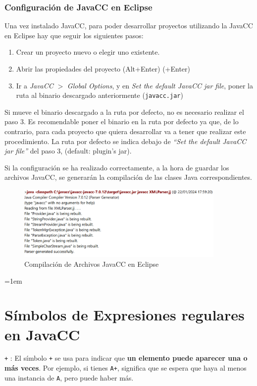 \subsubsection{Configuración de JavaCC en Eclipse}

Una vez instalado JavaCC, para poder desarrollar proyectos utilizando la JavaCC en Eclipse hay que seguir los siguientes pasos:
\begin{enumerate}
    \item Crear un proyecto nuevo o elegir uno existente.
    \item Abrir las propiedades del proyecto (Alt+Enter) (\cmdkey+Enter)
    \item  Ir a \textit{JavaCC} $>$ \textit{Global Options}, y en \textit{Set the default JavaCC jar file}, poner la ruta al binario descargado anteriormente (\lstinline|javacc.jar|)
\end{enumerate}

Si mueve el binario descargado a la ruta por defecto, no es necesario realizar el paso 3. Es recomendable poner el binario en la ruta por defecto ya que, de lo contrario, para cada proyecto que quiera desarrollar va a tener que realizar este procedimiento. La ruta por defecto se indica debajo de \textit{“Set the default JavaCC jar file”} del paso 3, (default: plugin’s jar).

Si la configuración se ha realizado correctamente, a la hora de guardar los archivos JavaCC, se generarán la compilación de las clases Java correspondientes.

\begin{figure}[H]
\centering
\includegraphics[width=0.9\textwidth]{imagenes/javacccompilation.png}
\caption{\label{fig:javacccompilation}Compilación de Archivos JavaCC en Eclipse}
\end{figure}
\emergencystretch=1em
\section{Símbolos de Expresiones regulares en JavaCC}
\label{sec:simbolosdeexpresionesregulares}
\lstinline[basicstyle=\large\ttfamily]|+| : El símbolo \lstinline[basicstyle=\large\ttfamily]|+| se usa para indicar que \textbf{un elemento puede aparecer una o más veces}. Por ejemplo, si tienes \lstinline[basicstyle=\large\ttfamily]|A+|, significa que se espera que haya al menos una instancia de \lstinline[basicstyle=\large\ttfamily]|A|, pero puede haber más.

